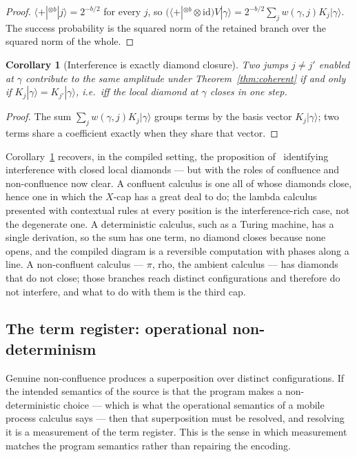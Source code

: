 \documentclass[11pt]{article}
\theoremstyle{definition}
\theoremstyle{plain}
\newtheorem{corollary}[definition]{Corollary}
\newcommand{\id}{\mathrm{id}}
\newcommand{\bra}[1]{\langle #1 |}
\newcommand{\ket}[1]{| #1 \rangle}
\begin{document}
\begin{proof}
$\bra{+}^{\otimes b}\ket{j} = 2^{-b/2}$ for every $j$, so
$(\bra{+}^{\otimes b}\otimes\id)V\ket{\gamma} = 2^{-b/2}\sum_j w(\gamma,j)K_j\ket{\gamma}$. The
success probability is the squared norm of the retained branch over the squared norm of the
whole.
\end{proof}

\begin{corollary}[Interference is exactly diamond closure]\label{cor:diamond}
Two jumps $j\neq j'$ enabled at $\gamma$ contribute to the same amplitude under
Theorem~\ref{thm:coherent} if and only if $K_j\ket{\gamma} = K_{j'}\ket{\gamma}$, i.e.\ iff the
local diamond at $\gamma$ closes in one step.
\end{corollary}

\begin{proof}
The sum $\sum_j w(\gamma,j)K_j\ket{\gamma}$ groups terms by the basis vector
$K_j\ket{\gamma}$; two terms share a coefficient exactly when they share that vector.
\end{proof}

Corollary~\ref{cor:diamond} recovers, in the compiled setting, the proposition of~\cite{weighted}
identifying interference with closed local diamonds --- but with the roles of confluence and
non-confluence now clear. A confluent calculus is one all of whose diamonds close, hence one in
which the $X$-cap has a great deal to do; the lambda calculus presented with contextual rules at
every position is the interference-rich case, not the degenerate one. A deterministic calculus,
such as a Turing machine, has a single derivation, so the sum has one term, no diamond closes
because none opens, and the compiled diagram is a reversible computation with phases along a
line. A non-confluent calculus --- $\pi$, rho, the ambient calculus --- has diamonds that do not
close; those branches reach distinct configurations and therefore do not interfere, and what to
do with them is the third cap.

\subsection{The term register: operational non-determinism}

Genuine non-confluence produces a superposition over distinct configurations. If the intended
semantics of the source is that the program makes a non-deterministic choice --- which is what
the operational semantics of a mobile process calculus says --- then that superposition must be
resolved, and resolving it is a measurement of the term register. This is the sense in which
measurement matches the program semantics rather than repairing the encoding.
\end{document}
